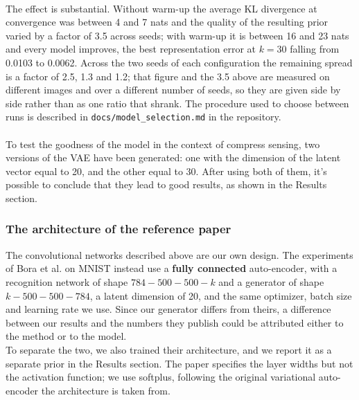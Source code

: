 \\
The effect is substantial. Without warm-up the average KL divergence at convergence was between 4 and 7 nats and the quality of the resulting prior varied by a factor of 3.5 across seeds; with warm-up it is between 16 and 23 nats and every model improves, the best representation error at \( k = 30 \) falling from 0.0103 to 0.0062. Across the two seeds of each configuration the remaining spread is a factor of 2.5, 1.3 and 1.2; that figure and the 3.5 above are measured on different images and over a different number of seeds, so they are given side by side rather than as one ratio that shrank. The procedure used to choose between runs is described in \texttt{docs/model\_selection.md} in the repository.
\\\\
To test the goodness of the model in the context of compress sensing, two versions of the VAE have been generated: one with the dimension of the latent vector equal to 20, and the other equal to 30. After using both of them, it’s possible to conclude that they lead to good results, as shown in the Results section.
\subsubsection{The architecture of the reference paper}

The convolutional networks described above are our own design. The experiments of Bora et al. \cite{bora2017} on MNIST instead use a \textbf{fully connected} auto-encoder, with a recognition network of shape \( 784-500-500-k \) and a generator of shape \( k-500-500-784 \), a latent dimension of 20, and the same optimizer, batch size and learning rate we use. Since our generator differs from theirs, a difference between our results and the numbers they publish could be attributed either to the method or to the model.
\\
To separate the two, we also trained their architecture, and we report it as a separate prior in the Results section. The paper specifies the layer widths but not the activation function; we use softplus, following the original variational auto-encoder \cite{kingma2014} the architecture is taken from.

